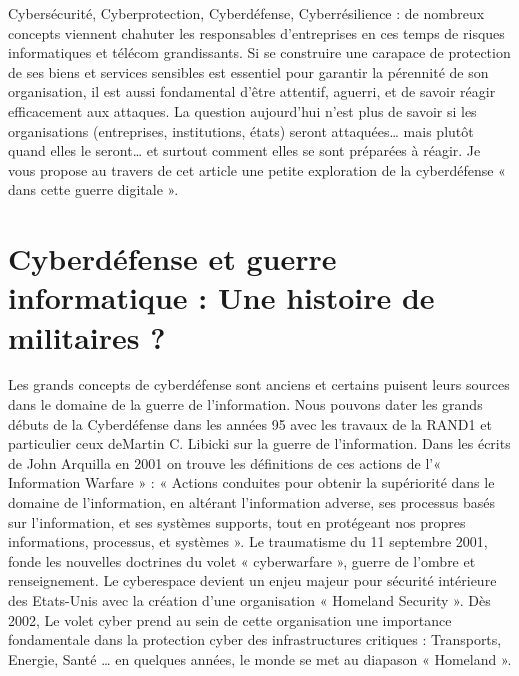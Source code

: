 %
%

Cybersécurité, Cyberprotection, Cyberdéfense, Cyberrésilience : de nombreux concepts viennent chahuter les responsables d’entreprises en ces temps de risques informatiques et télécom grandissants. Si se construire une carapace de protection de ses biens et services sensibles est essentiel pour garantir la pérennité de son organisation, il est aussi fondamental d’être attentif, aguerri, et de savoir réagir efficacement aux attaques. 
La question aujourd’hui n’est plus de savoir si les organisations (entreprises, institutions, états) seront attaquées… mais plutôt quand elles le seront… et surtout comment elles se sont préparées à réagir. Je vous propose au travers de cet article une petite exploration de la cyberdéfense « dans cette guerre digitale ».
 
\section{Cyberdéfense et guerre informatique : Une histoire de militaires ?}

Les grands concepts de cyberdéfense sont anciens et certains puisent leurs sources dans le domaine de la guerre de l’information. Nous pouvons dater les grands débuts de la Cyberdéfense dans les années 95 avec les travaux de la RAND1 et particulier ceux deMartin C. Libicki sur la guerre de l’information. Dans les écrits de John Arquilla en 2001 on trouve les définitions de ces actions de l’« Information Warfare » : « Actions conduites pour obtenir la supériorité dans le domaine de l’information, en altérant l’information adverse, ses processus basés sur l’information, et ses systèmes supports, tout en protégeant nos propres informations, processus, et systèmes ». Le traumatisme du 11 septembre 2001, fonde les nouvelles doctrines du volet « cyberwarfare », guerre de l’ombre et renseignement. Le cyberespace devient un enjeu majeur pour sécurité intérieure des Etats-Unis avec la création d’une organisation « Homeland Security ». Dès 2002, Le volet cyber prend au sein de cette organisation une importance fondamentale dans la protection cyber des infrastructures critiques : Transports, Energie, Santé … en quelques années, le monde se met au diapason « Homeland ».

